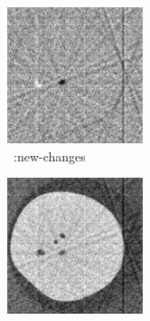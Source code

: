 \documentclass{article}
\begin{document}
\begin{figure}[!h]
    \begin{subfigure}[b]{0.24\linewidth}
        \includegraphics[width=\textwidth]{../images/comparison_lit/result_new_changes.png}
        \caption{~\cite{Lee2012}:new-changes}
     \end{subfigure}
\quad
    \begin{subfigure}[b]{0.24\linewidth}
        \includegraphics[width=\textwidth]{../images/comparison_lit/result_literature_test.png}

\end{subfigure}
\end{figure}
\end{document}
